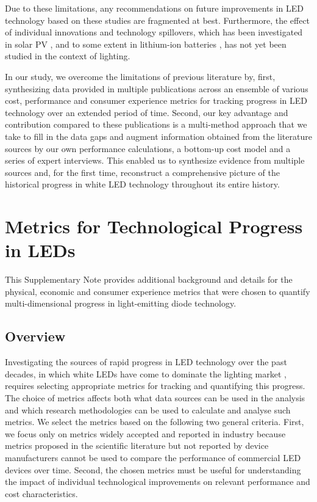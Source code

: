 \documentclass[parskip=full]{article}
\begin{document}
Due to these limitations, any recommendations on future improvements in LED technology based on these studies are fragmented at best. Furthermore, the effect of individual innovations and technology spillovers, which has been investigated in solar PV \cite{kavlak2018evaluating,kolesnikov2020novel,nemet2019solar}, and to some extent in lithium-ion batteries \cite{Stephan_2021}, has not yet been studied in the context of lighting.

In our study, we overcome the limitations of previous literature by, first, synthesizing data provided in multiple publications across an ensemble of various cost, performance and consumer experience metrics for tracking progress in LED technology over an extended period of time. Second, our key advantage and contribution compared to these publications is a multi-method approach that we take to fill in the data gaps and augment information obtained from the literature sources by our own performance calculations, a bottom-up cost model and a series of expert interviews. This enabled us to synthesize evidence from multiple sources and, for the first time, reconstruct a comprehensive picture of the historical progress in white LED technology throughout its entire history.

\section{Metrics for Technological Progress in LEDs}

This Supplementary Note provides additional background and details for the physical, economic and consumer experience metrics that were chosen to quantify multi-dimensional progress in light-emitting diode technology.

\subsection{Overview}

Investigating the sources of rapid progress in LED technology over the past decades, in which white LEDs have come to dominate the lighting market \cite{zissis2021}, requires selecting appropriate metrics for tracking and quantifying this progress. The choice of metrics affects both what data sources can be used in the analysis and which research methodologies can be used to calculate and analyse such metrics. We select the metrics based on the following two general criteria. First, we focus only on metrics widely accepted and reported in industry because metrics proposed in the scientific literature but not reported by device manufacturers cannot be used to compare the performance of commercial LED devices over time. Second, the chosen metrics must be useful for understanding the impact of individual technological improvements on relevant performance and cost characteristics.
\end{document}

